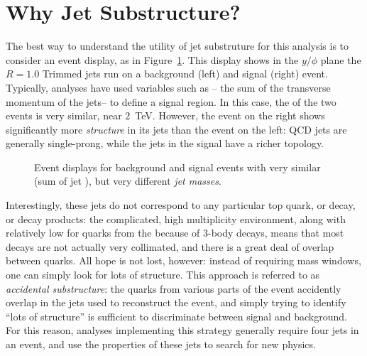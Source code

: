 \section{Why Jet Substructure?}

The best way to understand the utility of jet substruture for this analysis is to consider an event display, as in Figure~\ref{fig:search:motivation:event-displays}. This display shows in the $y/\phi$ plane the \antikt $R=1.0$ Trimmed jets run on a background (left) and signal (right) event. Typically, analyses have used variables such as \Ht-- the sum of the transverse momentum of the jets-- to define a signal region. In this case, the \Ht of the two events is very similar, near $2$~TeV. However, the event on the right shows significantly more \textit{structure} in its jets than the event on the left: QCD jets are generally single-prong, while the jets in the signal have a richer topology.  


\begin{figure}
\centering
{}
\label{fig:search:motivation:event-displays}
\caption{Event displays for background and signal events with very similar \Ht (sum of jet \pt), but very different \textit{jet masses}.}
\end{figure}


Interestingly, these \largeR jets do not correspond to any particular top quark, or \lsp decay, or \gl decay products: the complicated, high multiplicity environment, along with relatively low \pt for quarks from the \lsp because of 3-body decays, means that most decays are not actually very collimated, and there is a great deal of overlap between quarks. All hope is not lost, however: instead of requiring mass windows, one can simply look for lots of structure. This approach is referred to as \textit{accidental substructure}: the quarks from various parts of the event accidently overlap in the \largeR jets used to reconstruct the event, and simply trying to identify ``lots of structure'' is sufficient to discriminate between signal and background. For this reason, analyses implementing this strategy generally require four \largeR jets in an event, and use the properties of these jets to search for new physics. 

